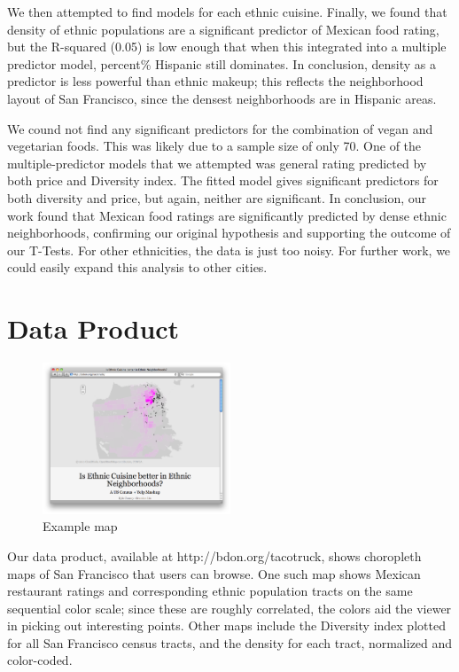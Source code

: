 \documentclass[11pt,twocolumn]{article}
\begin{document}
We then attempted to find models for each ethnic cuisine. Finally, we found that density of ethnic populations are a significant predictor of Mexican food rating, but the R-squared (0.05) is low enough that when this integrated into a multiple predictor model, percent\% Hispanic still dominates. In conclusion, density as a predictor is less powerful than ethnic makeup; this reflects the neighborhood layout of San Francisco, since the densest neighborhoods are in Hispanic areas.

We cound not find any significant predictors for the combination of vegan and vegetarian foods. This was likely due to a sample size of only 70. One of the multiple-predictor models that we attempted was general rating predicted by both price and Diversity index. The fitted model gives significant predictors for both diversity and price, but again, neither are significant. In conclusion, our work found that Mexican food ratings are significantly predicted by dense ethnic neighborhoods, confirming our original hypothesis and supporting the outcome of our T-Tests. For other ethnicities, the data is just too noisy. For further work, we could easily expand this analysis to other cities.

\section{Data Product}

\begin{figure}[h!]
  \caption{Example map}
  \centering
  \includegraphics[width=0.5\textwidth]{webapp_screen}
\end{figure}

Our data product, available at http://bdon.org/tacotruck, shows choropleth maps of San Francisco that users can browse. One such map shows Mexican restaurant ratings and corresponding ethnic population tracts on the same sequential color scale; since these are roughly correlated, the colors aid the viewer in picking out interesting points. Other maps include the Diversity index plotted for all San Francisco census tracts, and the density for each tract, normalized and color-coded.
\end{document}
